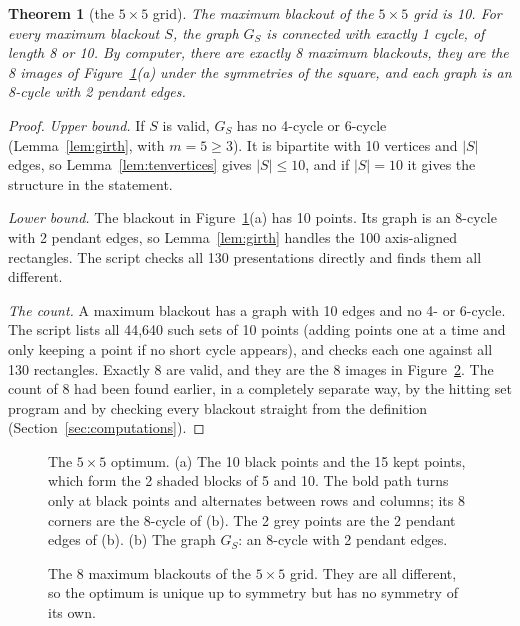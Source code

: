 \documentclass[11pt]{article}
\newtheorem{theorem}{Theorem}[section]
\theoremstyle{definition}
\theoremstyle{remark}
\begin{document}
\begin{theorem}[the $5\times5$ grid]\label{thm:fivefive}
The maximum blackout of the $5\times5$ grid is 10. For every maximum blackout $S$, the graph
$G_S$ is connected with exactly 1 cycle, of length 8 or 10. By computer, there are exactly 8
maximum blackouts, they are the 8 images of Figure~\ref{fig:fivefive}(a) under the symmetries of
the square, and each graph is an 8-cycle with 2 pendant edges.
\end{theorem}

\begin{proof}
\emph{Upper bound.} If $S$ is valid, $G_S$ has no 4-cycle or 6-cycle (Lemma~\ref{lem:girth}, with
$m=5\ge3$). It is bipartite with 10 vertices and $|S|$ edges, so Lemma~\ref{lem:tenvertices}
gives $|S|\le10$, and if $|S|=10$ it gives the structure in the statement.

\emph{Lower bound.} The blackout in Figure~\ref{fig:fivefive}(a) has 10 points. Its graph is an
8-cycle with 2 pendant edges, so Lemma~\ref{lem:girth} handles the 100 axis-aligned rectangles.
The script checks all 130 presentations directly and finds them all different.

\emph{The count.} A maximum blackout has a graph with 10 edges and no 4- or 6-cycle. The script
lists all 44,640 such sets of 10 points (adding points one at a time and only keeping a point if
no short cycle appears), and checks each one against all 130 rectangles. Exactly 8 are valid,
and they are the 8 images in Figure~\ref{fig:orbit}. The count of 8 had been found earlier, in a
completely separate way, by the hitting set program and by checking every blackout straight from
the definition (Section~\ref{sec:computations}).
\end{proof}

\begin{figure}[htbp]
\centering

\caption{The $5\times5$ optimum. (a) The 10 black points and the 15 kept points, which form the
2 shaded blocks of 5 and 10. The bold path turns only at black points and alternates between rows
and columns; its 8 corners are the 8-cycle of (b). The 2 grey points are the 2 pendant edges of
(b). (b) The graph $G_S$: an 8-cycle with 2 pendant edges.}
\label{fig:fivefive}
\end{figure}

\begin{figure}[htbp]
\centering

\caption{The 8 maximum blackouts of the $5\times5$ grid. They are all different, so the optimum
is unique up to symmetry but has no symmetry of its own.}
\label{fig:orbit}
\end{figure}
\end{document}
